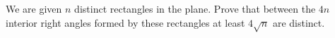 We are given $n$ distinct rectangles in the plane.
Prove that between the $4n$ interior right angles formed by these rectangles at least $4\sqrt{n}$ are distinct.
